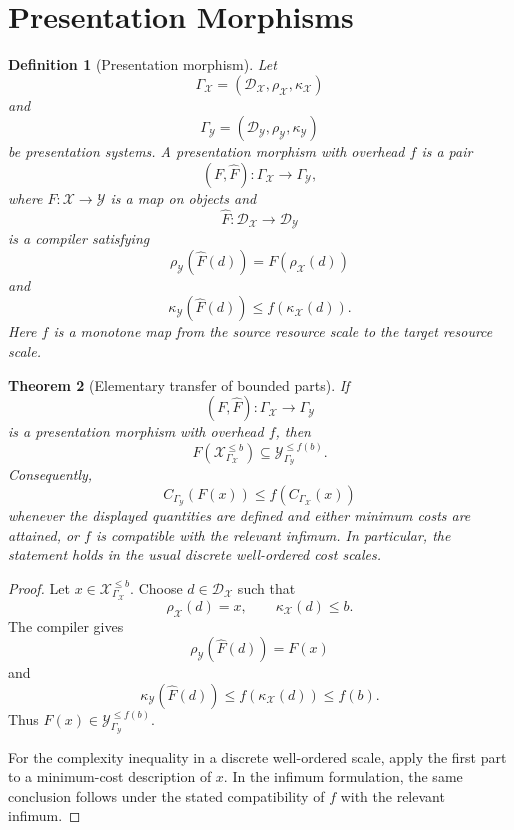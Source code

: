 \documentclass[11pt]{article}
\newtheorem{theorem}{Theorem}[section]
\newtheorem{definition}[theorem]{Definition}
\begin{document}
\section{Presentation Morphisms}

\begin{definition}[Presentation morphism]
Let
\[
\Gamma_\mathcal X=(\mathcal D_\mathcal X,\rho_\mathcal X,\kappa_\mathcal X)
\]
and
\[
\Gamma_\mathcal Y=(\mathcal D_\mathcal Y,\rho_\mathcal Y,\kappa_\mathcal Y)
\]
be presentation systems. A presentation morphism with overhead \(f\) is a pair
\[
(F,\widehat F):\Gamma_\mathcal X\to\Gamma_\mathcal Y,
\]
where \(F:\mathcal X\to\mathcal Y\) is a map on objects and
\[
\widehat F:\mathcal D_\mathcal X\to\mathcal D_\mathcal Y
\]
is a compiler satisfying
\[
\rho_\mathcal Y(\widehat F(d))=F(\rho_\mathcal X(d))
\]
and
\[
\kappa_\mathcal Y(\widehat F(d))
\leq
f(\kappa_\mathcal X(d)).
\]
Here \(f\) is a monotone map from the source resource scale to the target resource scale.
\end{definition}

\begin{theorem}[Elementary transfer of bounded parts]
If
\[
(F,\widehat F):\Gamma_\mathcal X\to\Gamma_\mathcal Y
\]
is a presentation morphism with overhead \(f\), then
\[
F(\mathcal X_{\Gamma_\mathcal X}^{\leq b})
\subseteq
\mathcal Y_{\Gamma_\mathcal Y}^{\leq f(b)}.
\]
Consequently,
\[
C_{\Gamma_\mathcal Y}(F(x))
\leq
f(C_{\Gamma_\mathcal X}(x))
\]
whenever the displayed quantities are defined and either minimum costs are attained, or \(f\) is compatible with the relevant infimum. In particular, the statement holds in the usual discrete well-ordered cost scales.
\end{theorem}

\begin{proof}
Let \(x\in\mathcal X_{\Gamma_\mathcal X}^{\leq b}\). Choose \(d\in\mathcal D_\mathcal X\) such that
\[
\rho_\mathcal X(d)=x,\qquad \kappa_\mathcal X(d)\leq b.
\]
The compiler gives
\[
\rho_\mathcal Y(\widehat F(d))=F(x)
\]
and
\[
\kappa_\mathcal Y(\widehat F(d))
\leq f(\kappa_\mathcal X(d))
\leq f(b).
\]
Thus \(F(x)\in\mathcal Y_{\Gamma_\mathcal Y}^{\leq f(b)}\).

For the complexity inequality in a discrete well-ordered scale, apply the first part to a minimum-cost description of \(x\). In the infimum formulation, the same conclusion follows under the stated compatibility of \(f\) with the relevant infimum.
\end{proof}
\end{document}

